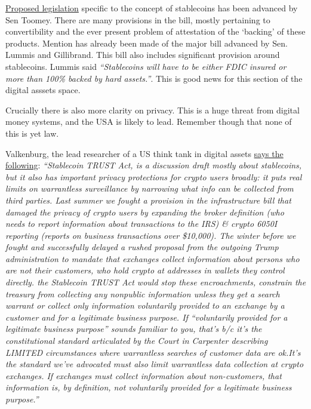 \href{https://www.americanbanker.com/news/toomey-unveils-stablecoin-bill-granting-occ-authority-for-payments-charter}{Proposed legislation} specific to the concept of stablecoins has been advanced by Sen Toomey. There are many provisions in the bill, mostly pertaining to convertibility and the ever present problem of attestation of the `backing' of these products. Mention has already been made of the major bill advanced by Sen. Lummis and Gillibrand. This bill also includes significant provision around stablecoins. Lummis said \textit{``Stablecoins will have to be either FDIC insured or more than 100\% backed by hard assets.''}. This is good news for this section of the digital asssets space.\par
Crucially there is also more clarity on privacy. This is a huge threat from digital money systems, and the USA is likely to lead. Remember though that none of this is yet law.\par 
Valkenburg, the lead researcher of a US think tank in digital assets \href{https://twitter.com/valkenburgh/status/1511783339065237521}{says the following}: \textit{``Stablecoin TRUST Act, is a discussion draft mostly about stablecoins, but it also has important privacy protections for crypto users broadly: it puts real limits on warrantless surveillance by narrowing what info can be collected from third parties. Last summer we fought a provision in the infrastructure bill that damaged the privacy of crypto users by expanding the broker definition (who needs to report information about transactions to the IRS) \& crypto 6050I reporting (reports on business transactions over \$10,000). The winter before we fought and successfully delayed a rushed proposal from the outgoing Trump administration to mandate that exchanges collect information about persons who are not their customers, who hold crypto at addresses in wallets they control directly. the Stablecoin TRUST Act would stop these encroachments, constrain the treasury from collecting any nonpublic information unless they get a search warrant or collect only information voluntarily provided to an exchange by a customer and for a legitimate business purpose. If “voluntarily provided for a legitimate business purpose” sounds familiar to you, that’s b/c it's the constitutional standard articulated by the Court in Carpenter describing LIMITED circumstances where warrantless searches of customer data are ok.It’s the standard we’ve advocated must also limit warrantless data collection at crypto exchanges. If exchanges must collect information about non-customers, that information is, by definition, not voluntarily provided for a legitimate business purpose.''}


